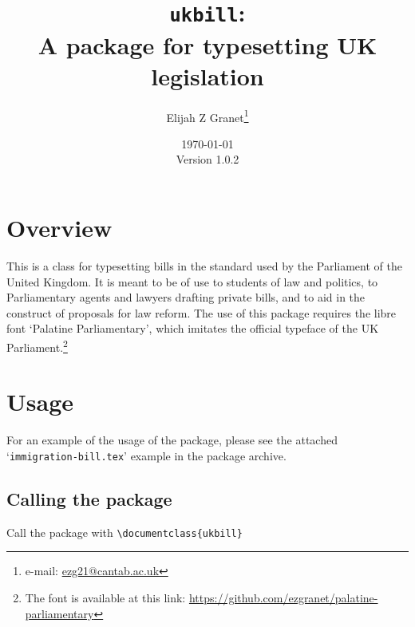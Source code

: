 \documentclass{article}
\date{\today\\\smallskip\ttfamily Version 1.0.2}
\author{Elijah Z Granet\thanks{e-mail: \href{mailto:ezg21@cantab.ac.uk}{\ttfamily ezg21@cantab.ac.uk}}}
\title{\texttt{ukbill}:\\A package for typesetting UK legislation}
\begin{document}
\maketitle
\tableofcontents
\clearpage
\section{Overview}
This is a class for typesetting bills in the standard used by the Parliament of the United Kingdom. It is meant to be of use to students of law and politics, to Parliamentary agents and lawyers drafting private bills, and to aid in the construct of proposals for law reform. The use of this package requires the libre font `Palatine Parliamentary', which imitates the official typeface of the UK Parliament.\footnote{The font is available at this link: \url{https://github.com/ezgranet/palatine-parliamentary}}
\section{Usage}
For an example of the usage of the package, please see the attached `\texttt{immigration-bill.tex}' example in the package archive.

\subsection{Calling the package}
Call the package with {\color{darkspringgreen}\ttfamily \verb|\documentclass{ukbill}|}
\end{document}
